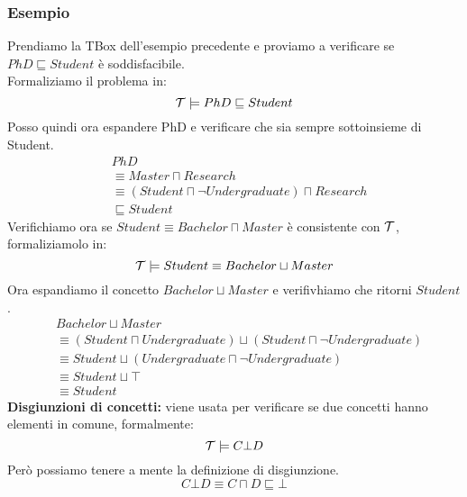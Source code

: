\documentclass[../main.tex]{subfiles}
\begin{document}
   \subsubsection{Esempio}
   Prendiamo la TBox dell'esempio precedente e proviamo a verificare se $PhD \sqsubseteq Student$ è soddisfacibile.\\
   Formaliziamo il problema in:
   \begin{equation*}
      \mathcal{T} \models PhD \sqsubseteq Student
   \end{equation*}
   Posso quindi ora espandere PhD e verificare che sia sempre sottoinsieme di Student.
   \begin{align*}
      &PhD\\
      &\equiv Master \sqcap Research\\
      &\equiv (Student \sqcap \lnot Undergraduate) \sqcap Research\\
      &\sqsubseteq Student
   \end{align*}
   \spazio
   Verifichiamo ora se $Student \equiv Bachelor \sqcap Master$ è consistente con $\mathcal{T}$, formaliziamolo in:
   \begin{equation*}
      \mathcal{T} \models Student \equiv Bachelor \sqcup Master
   \end{equation*}
   Ora espandiamo il concetto $Bachelor \sqcup Master$ e verifivhiamo che ritorni $Student$.
   \begin{align*}
      &Bachelor \sqcup Master\\
      &\equiv (Student \sqcap Undergraduate) \sqcup (Student \sqcap \lnot Undergraduate)\\
      &\equiv Student \sqcup (Undergraduate \sqcap \lnot Undergraduate)\\
      &\equiv Student \sqcup \top\\
      &\equiv Student 
   \end{align*}
   \spazio
   \textbf{Disgiunzioni di concetti:} viene usata per verificare se due concetti hanno elementi in comune, formalmente:
   \begin{equation*}
      \mathcal{T} \models C \bot D
   \end{equation*}
   Però possiamo tenere a mente la definizione di disgiunzione.
   \begin{equation*}
      C \bot D \equiv C \sqcap D \sqsubseteq \bot
   \end{equation*}
\end{document}
